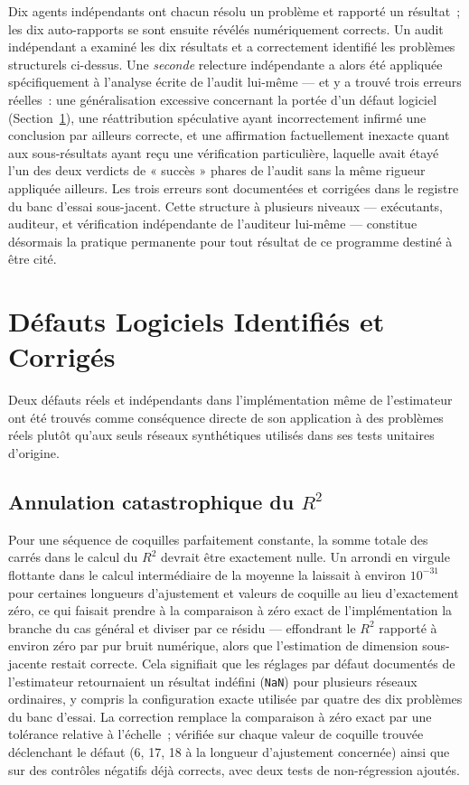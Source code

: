 \documentclass[11pt,a4paper]{article}
\begin{document}
Dix agents indépendants ont chacun résolu un problème et rapporté un
résultat~; les dix auto-rapports se sont ensuite révélés numériquement
corrects. Un audit indépendant a examiné les dix résultats et a
correctement identifié les problèmes structurels ci-dessus. Une
\emph{seconde} relecture indépendante a alors été appliquée
spécifiquement à l'analyse écrite de l'audit lui-même --- et y a trouvé
trois erreurs réelles~: une généralisation excessive concernant la portée
d'un défaut logiciel (Section~\ref{sec:defauts}), une réattribution
spéculative ayant incorrectement infirmé une conclusion par ailleurs
correcte, et une affirmation factuellement inexacte quant aux
sous-résultats ayant reçu une vérification particulière, laquelle avait
étayé l'un des deux verdicts de « succès » phares de l'audit sans la même
rigueur appliquée ailleurs. Les trois erreurs sont documentées et
corrigées dans le registre du banc d'essai sous-jacent. Cette structure à
plusieurs niveaux --- exécutants, auditeur, et vérification indépendante
de l'auditeur lui-même --- constitue désormais la pratique permanente pour
tout résultat de ce programme destiné à être cité.

\section{Défauts Logiciels Identifiés et Corrigés}
\label{sec:defauts}

Deux défauts réels et indépendants dans l'implémentation même de
l'estimateur ont été trouvés comme conséquence directe de son application
à des problèmes réels plutôt qu'aux seuls réseaux synthétiques utilisés
dans ses tests unitaires d'origine.

\subsection{Annulation catastrophique du \texorpdfstring{$R^2$}{R2}}

Pour une séquence de coquilles parfaitement constante, la somme totale des
carrés dans le calcul du $R^2$ devrait être exactement nulle. Un
arrondi en virgule flottante dans le calcul intermédiaire de la moyenne la
laissait à environ $10^{-31}$ pour certaines longueurs d'ajustement et
valeurs de coquille au lieu d'exactement zéro, ce qui faisait prendre à la
comparaison à zéro exact de l'implémentation la branche du cas général et
diviser par ce résidu --- effondrant le $R^2$ rapporté à environ zéro par
pur bruit numérique, alors que l'estimation de dimension sous-jacente
restait correcte. Cela signifiait que les réglages par défaut documentés
de l'estimateur retournaient un résultat indéfini (\texttt{NaN}) pour
plusieurs réseaux ordinaires, y compris la configuration exacte utilisée
par quatre des dix problèmes du banc d'essai. La correction remplace la
comparaison à zéro exact par une tolérance relative à l'échelle~; vérifiée
sur chaque valeur de coquille trouvée déclenchant le défaut (6, 17, 18 à
la longueur d'ajustement concernée) ainsi que sur des contrôles négatifs
déjà corrects, avec deux tests de non-régression ajoutés.
\end{document}
